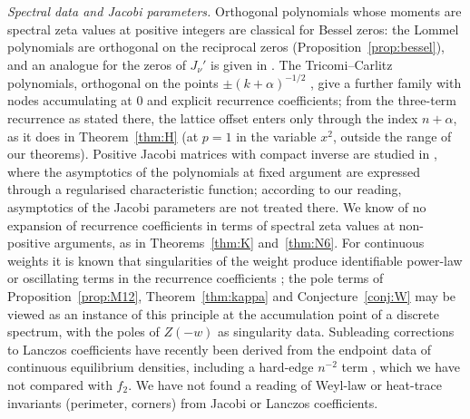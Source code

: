 \emph{Spectral data and Jacobi parameters.} Orthogonal polynomials whose moments are spectral zeta values at positive integers are
classical for Bessel zeros: the Lommel polynomials are orthogonal on the reciprocal zeros \cite{VA} (Proposition~\ref{prop:bessel}),
and an analogue for the zeros of $J_\nu'$ is given in \cite{ChungLeePark}. The Tricomi--Carlitz polynomials, orthogonal on the points
$\pm(k+\alpha)^{-1/2}$ \cite{WuLinXuZhao}, give a further family with nodes accumulating at $0$ and explicit recurrence coefficients;
from the three-term recurrence as stated there, the lattice offset enters only through the index $n+\alpha$, as it does in
Theorem~\ref{thm:H} (at $p=1$ in the variable $x^2$, outside the range of our theorems). Positive Jacobi matrices with compact inverse
are studied in \cite{StovicekSwiderski}, where the asymptotics of the polynomials at fixed argument are expressed through a regularised
characteristic function; according to our reading, asymptotics of the Jacobi parameters are not treated there. We know of no expansion
of recurrence coefficients in terms of spectral zeta values at non-positive arguments, as in Theorems~\ref{thm:K} and~\ref{thm:N6}. For
continuous weights it is known that singularities of the weight produce identifiable power-law or oscillating terms in the recurrence
coefficients \cite{Magnus,FoulquieMoreno}; the pole terms of Proposition~\ref{prop:M12}, Theorem~\ref{thm:kappa} and
Conjecture~\ref{conj:W} may be viewed as an instance of this principle at the accumulation point of a discrete spectrum, with the poles
of $Z(-w)$ as singularity data. Subleading corrections to Lanczos coefficients have recently been derived from the endpoint data of
continuous equilibrium densities, including a hard-edge $n^{-2}$ term \cite{MuruganVanZylWatanabe}, which we have not compared with
$f_2$. We have not found a reading of Weyl-law or heat-trace invariants (perimeter, corners) from Jacobi or Lanczos coefficients.

